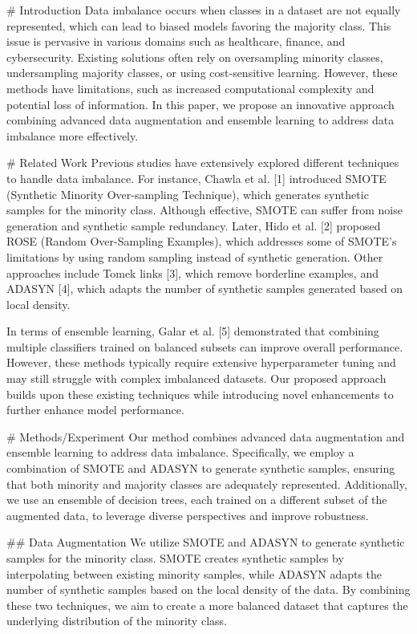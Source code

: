 # Introduction
Data imbalance occurs when classes in a dataset are not equally represented, which can lead to biased models favoring the majority class. This issue is pervasive in various domains such as healthcare, finance, and cybersecurity. Existing solutions often rely on oversampling minority classes, undersampling majority classes, or using cost-sensitive learning. However, these methods have limitations, such as increased computational complexity and potential loss of information. In this paper, we propose an innovative approach combining advanced data augmentation and ensemble learning to address data imbalance more effectively.

# Related Work
Previous studies have extensively explored different techniques to handle data imbalance. For instance, Chawla et al. [1] introduced SMOTE (Synthetic Minority Over-sampling Technique), which generates synthetic samples for the minority class. Although effective, SMOTE can suffer from noise generation and synthetic sample redundancy. Later, Hido et al. [2] proposed ROSE (Random Over-Sampling Examples), which addresses some of SMOTE’s limitations by using random sampling instead of synthetic generation. Other approaches include Tomek links [3], which remove borderline examples, and ADASYN [4], which adapts the number of synthetic samples generated based on local density.

In terms of ensemble learning, Galar et al. [5] demonstrated that combining multiple classifiers trained on balanced subsets can improve overall performance. However, these methods typically require extensive hyperparameter tuning and may still struggle with complex imbalanced datasets. Our proposed approach builds upon these existing techniques while introducing novel enhancements to further enhance model performance.

# Methods/Experiment
Our method combines advanced data augmentation and ensemble learning to address data imbalance. Specifically, we employ a combination of SMOTE and ADASYN to generate synthetic samples, ensuring that both minority and majority classes are adequately represented. Additionally, we use an ensemble of decision trees, each trained on a different subset of the augmented data, to leverage diverse perspectives and improve robustness.

## Data Augmentation
We utilize SMOTE and ADASYN to generate synthetic samples for the minority class. SMOTE creates synthetic samples by interpolating between existing minority samples, while ADASYN adapts the number of synthetic samples based on the local density of the data. By combining these two techniques, we aim to create a more balanced dataset that captures the underlying distribution of the minority class.

